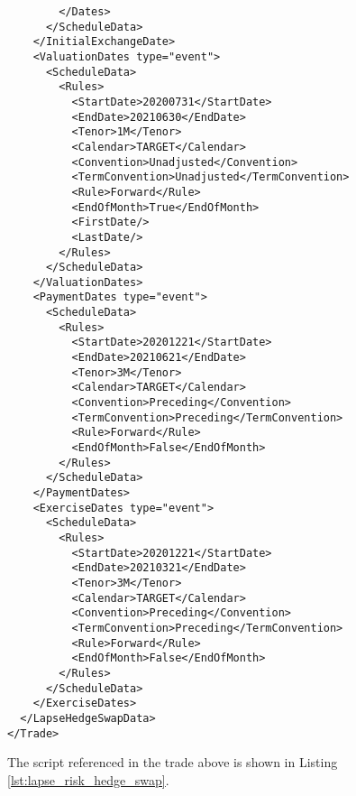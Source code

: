 \begin{verbatim}
        </Dates>
      </ScheduleData>
    </InitialExchangeDate>
    <ValuationDates type="event">
      <ScheduleData>
        <Rules>
          <StartDate>20200731</StartDate>
          <EndDate>20210630</EndDate>
          <Tenor>1M</Tenor>
          <Calendar>TARGET</Calendar>
          <Convention>Unadjusted</Convention>
          <TermConvention>Unadjusted</TermConvention>
          <Rule>Forward</Rule>
          <EndOfMonth>True</EndOfMonth>
          <FirstDate/>
          <LastDate/>
        </Rules>
      </ScheduleData>
    </ValuationDates>
    <PaymentDates type="event">
      <ScheduleData>
        <Rules>
          <StartDate>20201221</StartDate>
          <EndDate>20210621</EndDate>
          <Tenor>3M</Tenor>
          <Calendar>TARGET</Calendar>
          <Convention>Preceding</Convention>
          <TermConvention>Preceding</TermConvention>
          <Rule>Forward</Rule>
          <EndOfMonth>False</EndOfMonth>
        </Rules>
      </ScheduleData>
    </PaymentDates>
    <ExerciseDates type="event">
      <ScheduleData>
        <Rules>
          <StartDate>20201221</StartDate>
          <EndDate>20210321</EndDate>
          <Tenor>3M</Tenor>
          <Calendar>TARGET</Calendar>
          <Convention>Preceding</Convention>
          <TermConvention>Preceding</TermConvention>
          <Rule>Forward</Rule>
          <EndOfMonth>False</EndOfMonth>
        </Rules>
      </ScheduleData>
    </ExerciseDates>
  </LapseHedgeSwapData>
</Trade>
\end{verbatim} 
 
The script referenced in the trade above is shown in Listing \ref{lst:lapse_risk_hedge_swap}.
 
